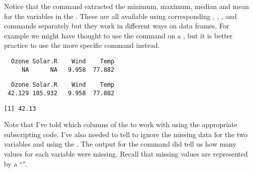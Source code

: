 Notice that the  command extracted the minimum, maximum, median and mean for the variables in the . These are all available using corresponding , , , and  commands separately but they work in different ways on data frames. For example we might have thought to use the  command on a , but it is better practice to use the more specific  command instead. 
\begin{knitrout}
\color{fgcolor}\begin{kframe}
\begin{alltt}
\hlstd{> }\hlstd{(airquality[,}\hlopt{:}\hlstd{])}
\end{alltt}
\begin{verbatim}
  Ozone Solar.R    Wind    Temp 
     NA      NA   9.958  77.882 
\end{verbatim}
\begin{alltt}
\hlstd{> }\hlstd{(airquality[,}\hlopt{:}\hlstd{],} \hlstd{=}\hlstd{)}
\end{alltt}
\begin{verbatim}
  Ozone Solar.R    Wind    Temp 
 42.129 185.932   9.958  77.882 
\end{verbatim}
\begin{alltt}
\hlstd{> }\hlstd{(airquality[,}\hlstd{],} \hlstd{=}\hlstd{)}
\end{alltt}
\begin{verbatim}
[1] 42.13
\end{verbatim}
\end{kframe}
\end{knitrout}
Note that I've told \R{} which columns of the   to work with using the appropriate subscripting code. I've also needed to tell \R{} to ignore the missing data for the two variables  and  using the . The output for the  command did tell us how many values for each variable were missing. Recall that missing values are represented by a ``". 
 
